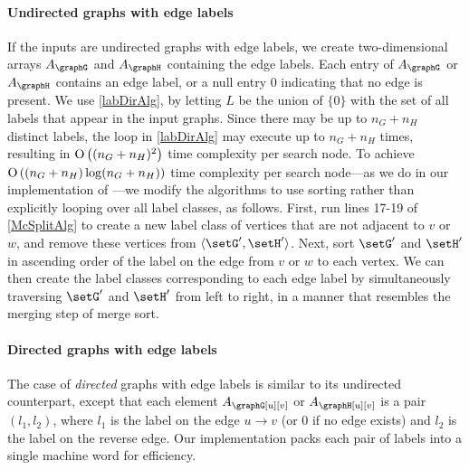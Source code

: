 \paragraph{Undirected graphs with edge labels} If the inputs are
undirected graphs with edge labels, we create two-dimensional
arrays $A_\graphG$ and $A_\graphH$ containing the edge labels.
Each entry of $A_\graphG$ or $A_\graphH$ contains an
edge label, or a null entry $0$ indicating that no edge is present.  We use \cref{labDirAlg}, by
letting $L$ be the union of $\{0\}$ with the set of all labels that appear in
the input graphs. Since there may be up to $n_G + n_H$ distinct labels, the loop in
\cref{labDirAlg} may execute up to $n_G + n_H$ times, resulting in $\operatorname{O}\left((n_G+n_H)^2\right)$
time complexity per search node.  To achieve $\operatorname{O}\left((n_G+n_H) \log (n_G+n_H)\right)$ time
complexity per search node---as we do in our implementation of \McSplit---we
modify the algorithms to use sorting rather
than explicitly looping over all label classes, as follows.  First, run lines
17-19 of \cref{McSplitAlg} to create a new label class of vertices that are
not adjacent to $v$ or $w$, and remove these vertices from $\langle \setG',\setH'
\rangle$.  Next, sort $\setG'$ and $\setH'$ in ascending order of the label on the edge
from $v$ or $w$ to each vertex. We can then create the label classes
corresponding to each edge label by simultaneously traversing $\setG'$ and $\setH'$
from left to right, in a manner that resembles the merging step of merge sort.

\paragraph{Directed graphs with edge labels} The case
of \emph{directed} graphs with edge labels is similar to its undirected
counterpart, except that each element $A_\graphG[u][v]$ or $A_\graphH[u][v]$ is a
pair $(l_1, l_2)$, where $l_1$ is the label on the edge $u \rightarrow v$ (or 0
if no edge exists) and $l_2$ is the label on the reverse edge.
Our implementation packs each pair of labels into a single machine word for efficiency.


